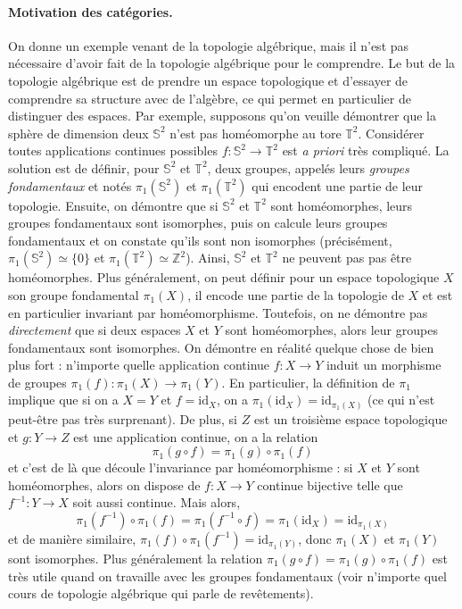 \documentclass{article}
\newcommand{\id}{\mathrm{id}}
\newcommand{\Z}{\mathbb{Z}}
\renewcommand{\S}{\mathbb{S}}
\newcommand{\T}{\mathbb{T}}
\theoremstyle{plain}
\theoremstyle{definition}
\theoremstyle{remark}
\begin{document}
\paragraph{Motivation des catégories.} On donne un exemple venant de la topologie algébrique, mais il n'est pas nécessaire d'avoir fait de la topologie algébrique pour le comprendre. Le but de la topologie algébrique est de prendre un espace topologique et d'essayer de comprendre sa structure avec de l'algèbre, ce qui permet en particulier de distinguer des espaces. Par exemple, supposons qu'on veuille démontrer que la sphère de dimension deux $\S^2$ n'est pas homéomorphe au tore $\T^2$. Considérer toutes applications continues possibles $f : \S^2 \to \T^2$ est \emph{a priori} très compliqué. La solution est de définir, pour $\S^2$ et $\T^2$, deux groupes, appelés leurs \emph{groupes fondamentaux} et notés $\pi_1 (\S^2)$ et $\pi_1(\T^2)$ qui encodent une partie de leur topologie. Ensuite, on démontre que si $\S^2$ et $\T^2$ sont homéomorphes, leurs groupes fondamentaux sont isomorphes, puis on calcule leurs groupes fondamentaux et on constate qu'ils sont non isomorphes (précisément, $\pi_1(\S^2) \simeq \{0\}$ et $\pi_1(\T^2) \simeq \Z^2$). Ainsi, $\S^2$ et $\T^2$ ne peuvent pas pas être homéomorphes. Plus généralement, on peut définir pour un espace topologique $X$ son groupe fondamental $\pi_1(X)$, il encode une partie de la topologie de $X$ et est en particulier invariant par homéomorphisme. Toutefois, on ne démontre pas \emph{directement} que si deux espaces $X$ et $Y$ sont homéomorphes, alors leur groupes fondamentaux sont isomorphes. On démontre en réalité quelque chose de bien plus fort : n'importe quelle application continue $f : X \to Y$ induit un morphisme de groupes $\pi_1(f) : \pi_1 (X) \to \pi_1(Y)$. En particulier, la définition de $\pi_1$ implique que si on a $X = Y$ et $f = \id_X$, on a $\pi_1(\id_X) = \id_{\pi_1(X)}$ (ce qui n'est peut-être pas très surprenant). De plus, si $Z$ est un troisième espace topologique et $g : Y \to Z$ est une application continue, on a la relation
\[\pi_1 (g \circ f) = \pi_1 (g) \circ \pi_1(f)\]
et c'est de là que découle l'invariance par homéomorphisme : si $X$ et $Y$ sont homéomorphes, alors on dispose de $f : X \to Y$ continue bijective telle que $f^{-1} : Y \to X$ soit aussi continue. Mais alors,
\[\pi_1(f^{-1}) \circ \pi_1 (f) = \pi_1(f^{-1} \circ f) = \pi_1(\id_X) = \id_{\pi_1 (X)}\]
et de manière similaire, $\pi_1(f) \circ \pi_1(f^{-1}) = \id_{\pi_1 (Y)}$, donc $\pi_1(X)$ et $\pi_1(Y)$ sont isomorphes. Plus généralement la relation $\pi_1(g\circ f) = \pi_1(g) \circ \pi_1(f)$ est très utile quand on travaille avec les groupes fondamentaux (voir n'importe quel cours de topologie algébrique qui parle de revêtements). \\
\end{document}

